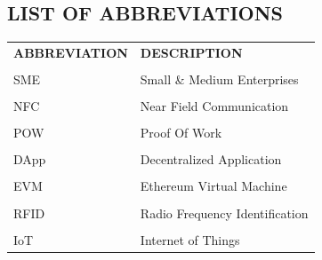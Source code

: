 \documentclass[12pt,a4paper]{report}
\begin{document}










\newpage
\pagestyle{empty}
\begin{center}
\tableofcontents 
\end{center}




\newpage
{\setlength{\baselineskip}{1\baselineskip}
\begin{center}	
\listoffigures				%
\end{center}		
}


\newpage
\pagestyle{plain}

\begin{center}
\section*{\large{ LIST OF ABBREVIATIONS}}		%
\end{center}



\pagestyle{plain}
\vspace{1cm}
\begin{center}
\begin{table}[h!]
 \begin{tabular}{p{8cm}p{8cm}}
  \textbf{ABBREVIATION} & \textbf{DESCRIPTION} \\[0.1cm]
  \\
SME&Small \& Medium Enterprises\\ 
\\
NFC&Near Field Communication\\
\\
POW&Proof Of Work\\
\\
DApp&Decentralized Application\\
\\ 
EVM&Ethereum Virtual Machine\\
\\
RFID&Radio Frequency Identification\\
\\
IoT&Internet of Things



\end{tabular}
\end{table}
\end{center}
\end{document}
